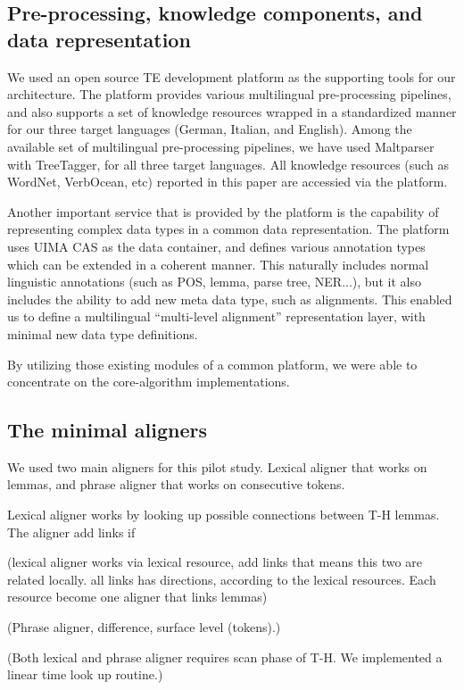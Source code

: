 \documentclass[11pt,letterpaper]{article}
\begin{document}
\subsection{Pre-processing, knowledge components, and data representation} 
We used an open source TE development platform \cite{} as the
supporting tools for our architecture. The platform provides various  
multilingual pre-processing pipelines, and also supports a set of
knowledge resources wrapped in a standardized manner for our three
target languages (German, Italian, and English). Among the available
set of multilingual pre-processing pipelines, we have used Maltparser
with TreeTagger, for all three target languages. All knowledge
resources (such as WordNet, VerbOcean, etc) reported in this paper
are accessied via the platform. 

Another important service that is provided by the platform is the
capability of representing complex data types in a common data
representation. The platform uses UIMA CAS as the data container, and
defines various annotation types which can be extended in a coherent
manner. This naturally includes normal linguistic annotations (such as
POS, lemma, parse tree, NER...), but it also includes the ability to
add new meta data type, such as alignments. This enabled us to define
a multilingual ``multi-level alignment''  representation layer, with
minimal new data type definitions.

By utilizing those existing modules of a common platform, we were able
to concentrate on the core-algorithm implementations.   

\subsection{The minimal aligners}
We used two main aligners for this pilot study. Lexical aligner that
works on lemmas, and phrase aligner that works on consecutive tokens. 

Lexical aligner works by looking up possible connections between T-H
lemmas. The aligner add links if 

(lexical aligner works via lexical resource, add links that means this
two are related locally. all links has directions, according to the
lexical resources. Each resource become one aligner that links lemmas)

(Phrase aligner, difference, surface level (tokens).)  

(Both lexical and phrase aligner requires scan phase of T-H. We
implemented a linear time look up routine.)
\end{document}
